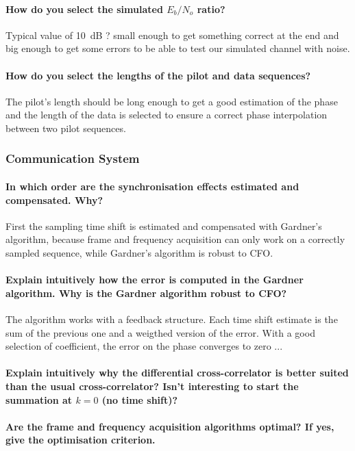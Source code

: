 \paragraph{How do you select the simulated $E_{b}/N_{o}$ ratio?} Typical value of \SI{10}{\deci\bel} ? small enough to get something correct at the end and big enough to get some errors to be able to test our simulated channel with noise.

\paragraph{How do you select the lengths of the pilot and data sequences?} The pilot's length should be long enough to get a good estimation of the phase and the length of the data is selected to ensure a correct phase interpolation between two pilot sequences.

\subsubsection{Communication System}


\paragraph{In which order are the synchronisation effects estimated and compensated. Why?} First the sampling time shift is estimated and compensated with Gardner's algorithm, because frame and frequency acquisition can only work on a correctly sampled sequence, while Gardner's algorithm is robust to CFO.


\paragraph{Explain intuitively how the error is computed in the Gardner algorithm. Why is the
Gardner algorithm robust to CFO?} The algorithm works with a feedback structure. Each time shift estimate is the sum of the previous one and a weigthed version of the error. With a good selection of coefficient, the error on the phase converges to zero ...


\paragraph{Explain intuitively why the differential cross-correlator is better suited than the usual cross-correlator? Isn’t interesting to start the summation at $k = 0$ (no time shift)?}


\paragraph{Are the frame and frequency acquisition algorithms optimal? If yes, give the optimisation criterion.}
